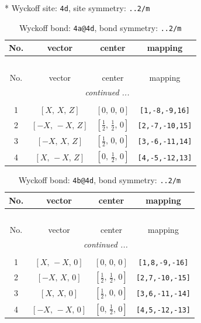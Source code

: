 \documentclass[fleqn,8pt]{jsarticle}
\begin{document}
* Wyckoff site: {\tt 4d}, site symmetry: {\tt ..2/m}
\renewcommand{\arraystretch}{1.2}
\begin{longtable}{cccc}
\caption{Wyckoff bond: {\tt 4a@4d}, bond symmetry: {\tt ..2/m}}
 \\
 \hline \hline
No. & vector & center & mapping \\ \hline \endfirsthead

\multicolumn{3}{l}{\tablename\ \thetable{}} \\
 \hline \hline
No. & vector & center & mapping \\ \hline \endhead

 \hline \hline
\multicolumn{3}{r}{\footnotesize\it continued ...} \\ \endfoot

 \hline \hline
\multicolumn{3}{r}{} \\ \endlastfoot

1 & $\left[ X,\, X,\, Z \right]$ & $\left[ 0,\, 0,\, 0 \right]$ & {\tt [1,-8,-9,16]} \\ \hline
2 & $\left[ - X,\, - X,\, Z \right]$ & $\left[ \frac{1}{2},\, \frac{1}{2},\, 0 \right]$ & {\tt [2,-7,-10,15]} \\ \hline
3 & $\left[ - X,\, X,\, Z \right]$ & $\left[ \frac{1}{2},\, 0,\, 0 \right]$ & {\tt [3,-6,-11,14]} \\ \hline
4 & $\left[ X,\, - X,\, Z \right]$ & $\left[ 0,\, \frac{1}{2},\, 0 \right]$ & {\tt [4,-5,-12,13]} \\
\end{longtable}
\renewcommand{\arraystretch}{1.2}
\begin{longtable}{cccc}
\caption{Wyckoff bond: {\tt 4b@4d}, bond symmetry: {\tt ..2/m}}
 \\
 \hline \hline
No. & vector & center & mapping \\ \hline \endfirsthead

\multicolumn{3}{l}{\tablename\ \thetable{}} \\
 \hline \hline
No. & vector & center & mapping \\ \hline \endhead

 \hline \hline
\multicolumn{3}{r}{\footnotesize\it continued ...} \\ \endfoot

 \hline \hline
\multicolumn{3}{r}{} \\ \endlastfoot

1 & $\left[ X,\, - X,\, 0 \right]$ & $\left[ 0,\, 0,\, 0 \right]$ & {\tt [1,8,-9,-16]} \\ \hline
2 & $\left[ - X,\, X,\, 0 \right]$ & $\left[ \frac{1}{2},\, \frac{1}{2},\, 0 \right]$ & {\tt [2,7,-10,-15]} \\ \hline
3 & $\left[ X,\, X,\, 0 \right]$ & $\left[ \frac{1}{2},\, 0,\, 0 \right]$ & {\tt [3,6,-11,-14]} \\ \hline
4 & $\left[ - X,\, - X,\, 0 \right]$ & $\left[ 0,\, \frac{1}{2},\, 0 \right]$ & {\tt [4,5,-12,-13]} \\
\end{longtable}
\end{document}
